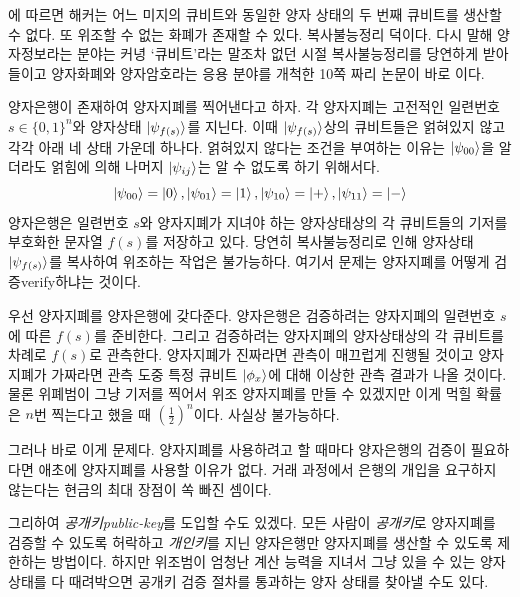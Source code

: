 \documentclass[a4paper,chapter,atbegshi]{oblivoir}
\begin{document}
에 따르면 해커는 어느 미지의 큐비트와 동일한 양자 상태의
두 번째 큐비트를 생산할 수 없다. 또 위조할 수 없는 화폐가 존재할 수 있다.
복사불능정리 덕이다. 다시 말해 양자정보라는 분야는 커녕 `큐비트'라는 말조차
없던 시절 복사불능정리를 당연하게 받아들이고 양자화폐와 양자암호라는 응용
분야를 개척한 10쪽 짜리 논문이 바로 이다.

양자은행이 존재하여 양자지폐를 찍어낸다고 하자. 각 양자지폐는 고전적인 
일련번호 $s\in\{0,1\}^n$와 양자상태 $\ket{\psi_{f(s)}}$를 지닌다. 이때
$\ket{\psi_{f(s)}}$상의 큐비트들은 얽혀있지 않고 각각 아래 네 상태 가운데
하나다. 얽혀있지 않다는 조건을 부여하는 이유는 $\ket{\psi_{00}}$을 
알더라도 얽힘에 의해 나머지 $\ket{\psi_{ij}}$는 알 수 없도록 하기 위해서다.
\[
  \ket{\psi_{00}}=\ket0,\ket{\psi_{01}}=\ket1,\ket{\psi_{10}}=\ket+,
  \ket{\psi_{11}}=\ket-
\]
양자은행은 일련번호 $s$와 양자지폐가 지녀야 하는 양자상태상의 각 큐비트들의
기저를 부호화한 문자열 $f(s)$를 저장하고 있다. 당연히 복사불능정리로 인해
양자상태 $\ket{\psi_{f(s)}}$를 복사하여 위조하는 작업은 불가능하다. 
여기서 문제는 양자지폐를 어떻게 검증{\tiny verify}하냐는 것이다.

우선 양자지폐를 양자은행에 갖다준다. 양자은행은 검증하려는 양자지폐의 일련번호
$s$에 따른 $f(s)$를 준비한다. 그리고 검증하려는 양자지폐의 양자상태상의 각
큐비트를 차례로 $f(s)$로 관측한다. 양자지폐가 진짜라면 관측이 매끄럽게 진행될
것이고 양자지폐가 가짜라면 관측 도중 특정 큐비트 $\ket{\phi_x}$에 대해 이상한
관측 결과가 나올 것이다. 물론 위폐범이 그냥 기저를 찍어서 위조 양자지폐를
만들 수 있겠지만 이게 먹힐 확률은 $n$번 찍는다고 했을 때 
$\left(\frac{1}{2}\right)^n$이다. 사실상 불가능하다.

그러나 바로 이게 문제다. 양자지폐를 사용하려고 할 때마다 양자은행의 검증이
필요하다면 애초에 양자지폐를 사용할 이유가 없다. 거래 과정에서 은행의 개입을
요구하지 않는다는 현금의 최대 장점이 쏙 빠진 셈이다. 

그리하여 \emph{공개키\tiny public-key}를 도입할 수도 있겠다. 모든 사람이
\emph{공개키}로 양자지폐를 검증할 수 있도록 허락하고 \emph{개인키}를 지닌
양자은행만 양자지폐를 생산할 수 있도록 제한하는 방법이다. 
하지만 위조범이 엄청난 계산 능력을 지녀서 그냥 있을 수 있는 양자 상태를
다 때려박으면 공개키 검증 절차를 통과하는 양자 상태를 찾아낼 수도 있다. 
\end{document}

